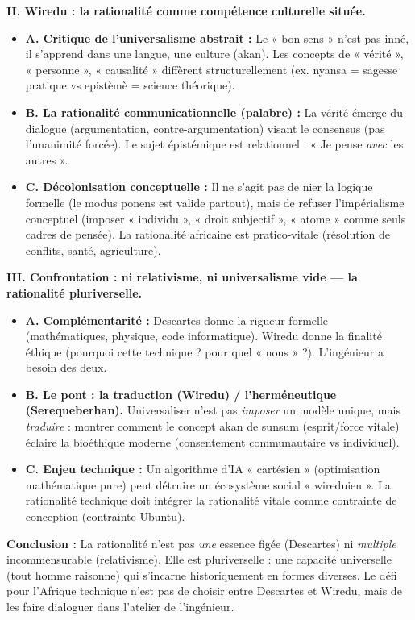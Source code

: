 \documentclass[11pt]{article}
\newcommand{\cle}[1]{{\popxbold\color{popdark}#1}}
\begin{document}
\begin{exoresolu}
\textbf{II. Wiredu : la rationalité comme compétence culturelle située.}
\begin{itemize}
    \item \textbf{A. Critique de l'universalisme abstrait :} Le « bon sens » n'est pas inné, il s'\cle{apprend} dans une langue, une culture (akan). Les concepts de « vérité », « personne », « causalité » diffèrent structurellement (ex. \cle{nyansa} = sagesse pratique vs \cle{epistèmè} = science théorique).
    \item \textbf{B. La rationalité communicationnelle (palabre) :} La vérité émerge du \cle{dialogue} (argumentation, contre-argumentation) visant le \cle{consensus} (pas l'unanimité forcée). Le sujet épistémique est \cle{relationnel} : « Je pense \emph{avec} les autres ».
    \item \textbf{C. Décolonisation conceptuelle :} Il ne s'agit pas de nier la logique formelle (le modus ponens est valide partout), mais de refuser l'\cle{impérialisme conceptuel} (imposer « individu », « droit subjectif », « atome » comme seuls cadres de pensée). La rationalité africaine est \cle{pratico-vitale} (résolution de conflits, santé, agriculture).
\end{itemize}

\textbf{III. Confrontation : ni relativisme, ni universalisme vide — la rationalité pluriverselle.}
\begin{itemize}
    \item \textbf{A. Complémentarité :} Descartes donne la \cle{rigueur formelle} (mathématiques, physique, code informatique). Wiredu donne la \cle{finalité éthique} (pourquoi cette technique ? pour quel « nous » ?). L'ingénieur a besoin des deux.
    \item \textbf{B. Le pont : la \cle{traduction} (Wiredu) / l'\cle{herméneutique} (Serequeberhan).} Universaliser n'est pas \emph{imposer} un modèle unique, mais \emph{traduire} : montrer comment le concept akan de \cle{sunsum} (esprit/force vitale) éclaire la bioéthique moderne (consentement communautaire vs individuel).
    \item \textbf{C. Enjeu technique :} Un algorithme d'IA « cartésien » (optimisation mathématique pure) peut détruire un écosystème social « wireduien ». La rationalité technique doit intégrer la \cle{rationalité vitale} comme contrainte de conception (contrainte Ubuntu).
\end{itemize}

\textbf{Conclusion :} La rationalité n'est pas \emph{une} essence figée (Descartes) ni \emph{multiple} incommensurable (relativisme). Elle est \cle{pluriverselle} : une capacité universelle (tout homme raisonne) qui s'\cle{incarne} historiquement en formes diverses. Le défi pour l'Afrique technique n'est pas de choisir entre Descartes et Wiredu, mais de \cle{les faire dialoguer} dans l'atelier de l'ingénieur.
\end{exoresolu}
\end{document}
